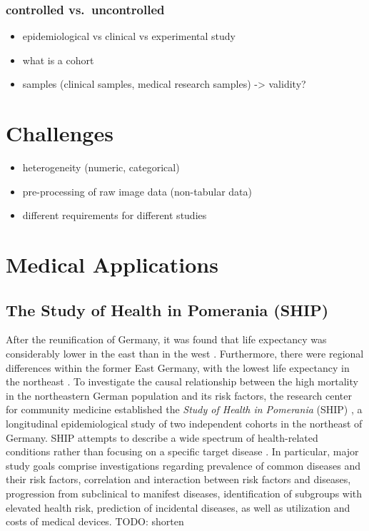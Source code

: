 \documentclass[
  oneside]{book}
\providecommand{\tightlist}{%
  \setlength{\itemsep}{0pt}\setlength{\parskip}{0pt}}
\begin{document}
\hypertarget{controlled-vs.-uncontrolled}{%
\subsubsection{controlled vs.~uncontrolled}\label{controlled-vs.-uncontrolled}}

\begin{itemize}
\tightlist
\item
  epidemiological vs clinical vs experimental study
\item
  what is a cohort
\item
  samples (clinical samples, medical research samples) -\textgreater{} validity?
\end{itemize}

\hypertarget{challenges}{%
\section{Challenges}\label{challenges}}

\begin{itemize}
\tightlist
\item
  heterogeneity (numeric, categorical)
\item
  pre-processing of raw image data (non-tabular data)
\item
  different requirements for different studies
\end{itemize}

\hypertarget{medical-applications}{%
\section{Medical Applications}\label{medical-applications}}

\hypertarget{ship}{%
\subsection{The Study of Health in Pomerania (SHIP)}\label{ship}}

After the reunification of Germany, it was found that life expectancy was considerably lower in the east than in the west \autocite{volzke2015prevalence}.
Furthermore, there were regional differences within the former East Germany, with the lowest life expectancy in the northeast \autocite{volzke2015prevalence,wiesner2004life}.
To investigate the causal relationship between the high mortality in the northeastern German population and its risk factors, the research center for community medicine established the \emph{Study of Health in Pomerania} (SHIP) \autocite{Voelzke:SHIP11}, a longitudinal epidemiological study of two independent cohorts in the northeast of Germany.
SHIP attempts to describe a wide spectrum of health-related conditions rather than focusing on a specific target disease \autocite{Voelzke:SHIP11}.
In particular, major study goals comprise investigations regarding prevalence of common diseases and their risk factors, correlation and interaction between risk factors and diseases, progression from subclinical to manifest diseases, identification of subgroups with elevated health risk, prediction of incidental diseases, as well as utilization and costs of medical devices. TODO: shorten
\end{document}
